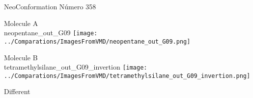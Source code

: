  \newpage

\vtab[-2cm]
\begin{center}
{\large NeoConformation \tab Número 358}
\end{center}
\begin{multicols}{2}
\begin{center}
Molecule A \\ 
neopentane\_out\_G09
\texttt{[image: ../Comparations/ImagesFromVMD/neopentane\_out\_G09.png]}
\\
\vtab

\columnbreak
Molecule B \\ 
tetramethylsilane\_out\_G09\_invertion
\texttt{[image: ../Comparations/ImagesFromVMD/tetramethylsilane\_out\_G09\_invertion.png]}
\\
\vtab


\end{center}
\end{multicols}
\begin{center}
\vtab
\vtab
\textcolor{NavyBlue}{\Large Different}
\end{center}

 \newpage

